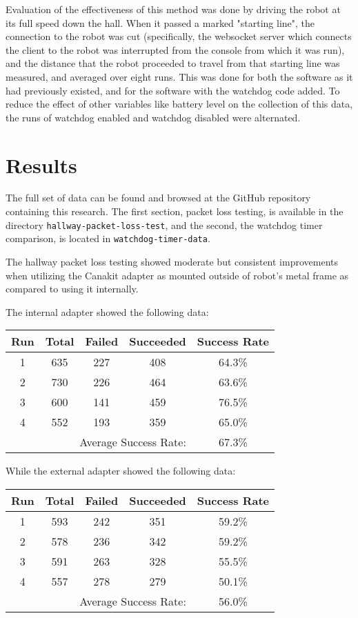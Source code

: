 \documentclass{IEEEtran}
\begin{document}
Evaluation of the effectiveness of this method was done by driving the robot
at its full speed down the hall. When it passed a marked "starting line",
the connection to the robot was cut (specifically, the websocket server which
connects the client to the robot was interrupted from the console from which
it was run), and the distance that the robot proceeded to travel from that
starting line was measured, and averaged over eight runs.
This was done for both the software as it had
previously existed, and for the software with the watchdog code added. To
reduce the effect of other variables like battery level on the collection of
this data, the runs of watchdog enabled and watchdog disabled were alternated.

\section{Results}
The full set of data can be found and browsed at the GitHub repository
containing this research\cite{uropgithub}. The first section, packet loss
testing, is available in the directory \texttt{hallway-packet-loss-test},
and the second, the watchdog timer comparison, is located in
\texttt{watchdog-timer-data}.

The hallway packet loss testing showed moderate but consistent improvements
when utilizing the Canakit adapter as mounted outside of robot's metal frame
as compared to using it internally.

The internal adapter showed the following data:

\begin{tabular}{ c | c | c | c | c }
  Run & Total & Failed & Succeeded & Success Rate \\ \hline
  1 & 635 & 227 & 408 & 64.3\% \\
  2 & 730 & 226 & 464 & 63.6\% \\
  3 & 600 & 141 & 459 & 76.5\% \\
  4 & 552 & 193 & 359 & 65.0\% \\
  \hline
  \multicolumn{4}{r}{Average Success Rate:} & 67.3\%
\end{tabular}

While the external adapter showed the following data:

\begin{tabular}{ c | c | c | c | c }
  Run & Total & Failed & Succeeded & Success Rate \\ \hline
  1 & 593 & 242 & 351 & 59.2\% \\
  2 & 578 & 236 & 342 & 59.2\% \\
  3 & 591 & 263 & 328 & 55.5\% \\
  4 & 557 & 278 & 279 & 50.1\% \\
  \hline
  \multicolumn{4}{r}{Average Success Rate:} & 56.0\%
\end{tabular}
\end{document}
